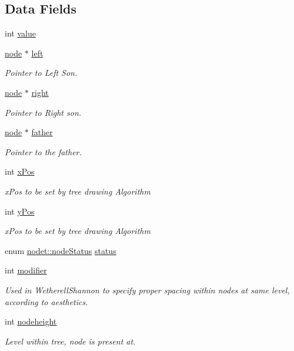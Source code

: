 \subsection*{Data Fields}
\begin{DoxyCompactItemize}
\item 
int \hyperlink{structnodet_ac4f474c82e82cbb89ca7c36dd52be0ed}{value}
\item 
\hyperlink{binary_tree_w_s_8h_aafd781b4673cf2585cd9a156aebd08de}{node} $\ast$ \hyperlink{structnodet_a1ef696d612a6d91ca233f86051a17560}{left}
\begin{DoxyCompactList}\small\item\em Pointer to Left Son. \end{DoxyCompactList}\item 
\hyperlink{binary_tree_w_s_8h_aafd781b4673cf2585cd9a156aebd08de}{node} $\ast$ \hyperlink{structnodet_ae274df3c21d52825564b9811fa84f71b}{right}
\begin{DoxyCompactList}\small\item\em Pointer to Right son. \end{DoxyCompactList}\item 
\hyperlink{binary_tree_w_s_8h_aafd781b4673cf2585cd9a156aebd08de}{node} $\ast$ \hyperlink{structnodet_ad584b58b1159012e8a83c77d0365453a}{father}
\begin{DoxyCompactList}\small\item\em Pointer to the father. \end{DoxyCompactList}\item 
int \hyperlink{structnodet_a6806e78862b165988ca9b855e230084e}{x\+Pos}
\begin{DoxyCompactList}\small\item\em x\+Pos to be set by tree drawing Algorithm \end{DoxyCompactList}\item 
int \hyperlink{structnodet_adbae1d6f68d046bbecaa7230baf64762}{y\+Pos}
\begin{DoxyCompactList}\small\item\em x\+Pos to be set by tree drawing Algorithm \end{DoxyCompactList}\item 
enum \hyperlink{structnodet_aab296cc56fa34a05b7d9d632a9ddef2a}{nodet\+::node\+Status} \hyperlink{structnodet_a4e847ae7c57663719cc9cfebfbbfe191}{status}
\item 
int \hyperlink{structnodet_a75316f8e4ed23559b01079c4af92cb68}{modifier}
\begin{DoxyCompactList}\small\item\em Used in Wetherell\+Shannon to specify proper spacing within nodes at same level, according to aesthetics. \end{DoxyCompactList}\item 
int \hyperlink{structnodet_a815b222b610a0a4544e97062f1850836}{nodeheight}
\begin{DoxyCompactList}\small\item\em Level within tree, node is present at. \end{DoxyCompactList}\end{DoxyCompactItemize}


